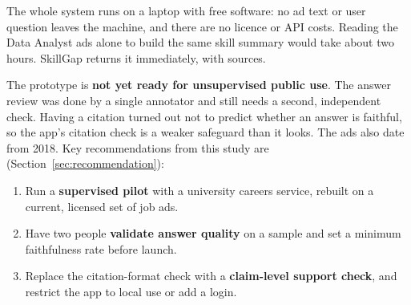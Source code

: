 The whole system runs on a laptop with free software: no ad text or user question leaves the machine, and there are no licence or API costs. Reading the Data Analyst ads alone to build the same skill summary would take about two hours. SkillGap returns it immediately, with sources.

The prototype is \textbf{not yet ready for unsupervised public use}. The answer review was done by a single annotator and still needs a second, independent check. Having a citation turned out not to predict whether an answer is faithful, so the app's citation check is a weaker safeguard than it looks. The ads also date from 2018. Key recommendations from this study are (Section~\ref{sec:recommendation}):
\begin{enumerate}
  \item Run a \textbf{supervised pilot} with a university careers service, rebuilt on a current, licensed set of job ads.
  \item Have two people \textbf{validate answer quality} on a sample and set a minimum faithfulness rate before launch.
  \item Replace the citation-format check with a \textbf{claim-level support check}, and restrict the app to local use or add a login.
\end{enumerate}

